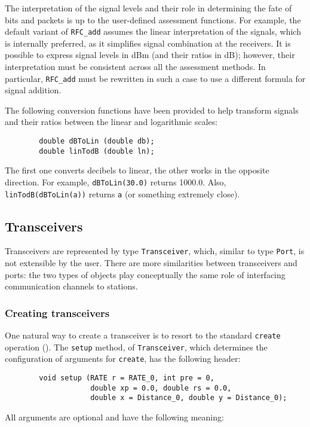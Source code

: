 The interpretation of the signal levels and their role in determining the fate
of bits and packets is up to the user-defined assessment functions. 
For example, the default variant of {\tt RFC\_add} assumes the linear
interpretation of the signals, which is internally preferred,
as it simplifies signal combination at the receivers.
It is possible to express signal levels in dBm (and their ratios in dB);
however, their interpretation must be consistent across all the
assessment methods.
In particular, {\tt RFC\_add} must be rewritten in such a case to use a
different formula for signal addition.

The following conversion functions have been provided to help transform
signals and their ratios between the linear and logarithmic scales:

\begin{verbatim}
        double dBToLin (double db);
        double linTodB (double ln);
\end{verbatim}

\noindent
The first one converts decibels to linear, the other works in the opposite
direction.
For example, {\tt dBToLin(30.0)} returns 1000.0.
Also, {\tt linTodB(dBToLin(a))} returns {\tt a} (or something extremely close).

\subsection{Transceivers}
\label{rm_to_tr}

Transceivers are represented by type {\tt Transceiver}, which, similar to
type {\tt Port}, is not extensible by the user.
There are more similarities between transceivers and ports: the two types
of objects play conceptually the same role of interfacing communication
channels to stations.

\subsubsection{Creating transceivers}
\label{rm_to_tr_cr}

One natural way to create a transceiver is to resort to the standard
{\tt create} operation ().
The {\tt setup} method, of {\tt Transceiver},
which determines the configuration of arguments for
{\tt create}, has the following header:
\begin{verbatim}
        void setup (RATE r = RATE_0, int pre = 0,
                    double xp = 0.0, double rs = 0.0,
                    double x = Distance_0, double y = Distance_0);
\end{verbatim}
\noindent
All arguments are optional and have the following meaning:

